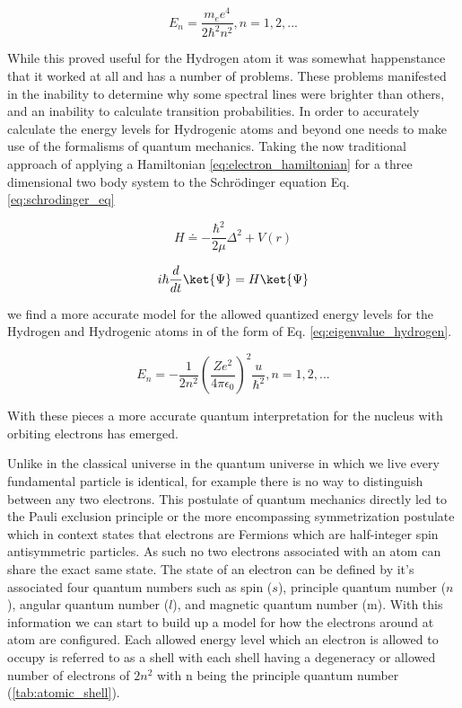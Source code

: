 \documentclass[jon_ringuette_thesis.tex]{subfiles}
\begin{document}
    \begin{equation}
        E_n = \frac{m_e e^4}{2 \hbar^2 n^2}, n=1, 2, ...
        \label{eq:bohr_energy_levels}
    \end{equation}

    While this proved useful for the Hydrogen atom it was somewhat happenstance that it worked at all and has a number of problems.
    These problems manifested in the inability to determine why some spectral lines were brighter than others, and an inability to calculate transition probabilities.
    In order to accurately calculate the energy levels for Hydrogenic atoms and beyond one needs to make use of the formalisms of quantum mechanics.
    Taking the now traditional approach of applying a Hamiltonian \ref{eq:electron_hamiltonian} for a three dimensional two body system to the Schr\"odinger equation Eq. \ref{eq:schrodinger_eq}

    \begin{equation}
        H \doteq -\frac{\hbar^2}{2\mu} \Delta^2 + V(r)
        \label{eq:electron_hamiltonian}
    \end{equation}

    \begin{equation}
        i\hbar\frac{d}{dt}\ket{\Psi} = H\ket{\Psi}
        \label{eq:schrodinger_eq}
    \end{equation}

    we find a more accurate model for the allowed quantized energy levels for the Hydrogen and Hydrogenic atoms in of the form of Eq. \ref{eq:eigenvalue_hydrogen}.

    \begin{equation}
        E_n = -\frac{1}{2n^2}\left( \frac{Ze^2}{4\pi \epsilon_0} \right)^2 \frac{u}{\hbar^2}, n=1, 2, ...
        \label{eq:eigenvalue_hydrogen}
    \end{equation}

    With these pieces a more accurate quantum interpretation for the nucleus with orbiting electrons has emerged.

    Unlike in the classical universe in the quantum universe in which we live every fundamental particle is identical, for example there is no way to distinguish between any two electrons.
    This postulate of quantum mechanics directly led to the Pauli exclusion principle or the more encompassing symmetrization postulate which in context states that electrons are Fermions which are half-integer spin antisymmetric particles.
    As such no two electrons associated with an atom can share the exact same state.
    The state of an electron can be defined by it's associated four quantum numbers such as spin ($s$), principle quantum number ($n$), angular quantum number ($l$), and magnetic quantum number (m).
    With this information we can start to build up a model for how the electrons around at atom are configured.
    Each allowed energy level which an electron is allowed to occupy is referred to as a shell with each shell having a degeneracy or allowed number of electrons of $2n^2$ with n being the principle quantum number (\ref{tab:atomic_shell}).
\end{document}
